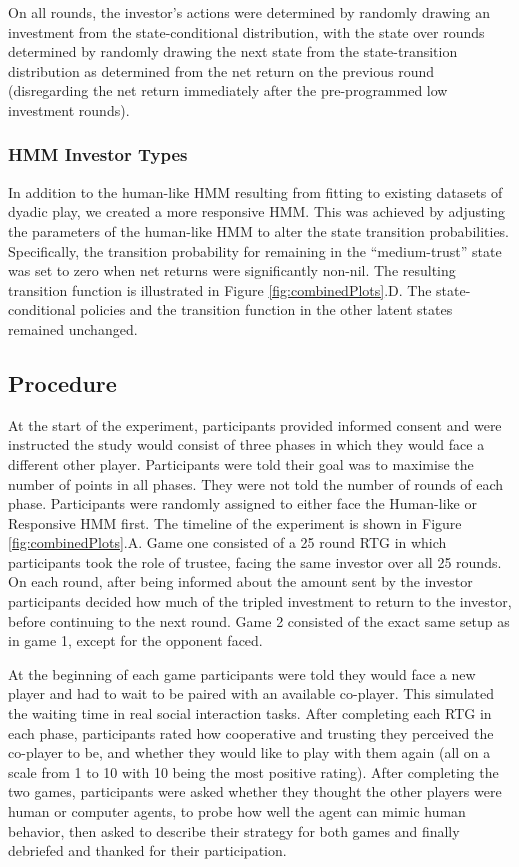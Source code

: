 \documentclass[
]{article}
\begin{document}
On all rounds, the investor's actions were
determined by randomly drawing an investment from the state-conditional
distribution, with the state over rounds determined by randomly drawing
the next state from the state-transition distribution as determined from
the net return on the previous round (disregarding the net return
immediately after the pre-programmed low investment rounds).

\subsubsection{HMM Investor Types}\label{hmm-investor-types}

In addition to the human-like HMM resulting from fitting to existing datasets of dyadic play, we created a more responsive HMM. This was achieved by adjusting the parameters of the human-like HMM to alter the state transition probabilities. Specifically, the transition probability for remaining in the ``medium-trust'' state was set to zero when net returns were significantly non-nil. The resulting transition function is illustrated in Figure \ref{fig:combinedPlots}.D. The state-conditional policies and the transition function in the other latent states remained unchanged.

\subsection{Procedure}\label{procedure}

At the start of the experiment, participants provided informed consent
and were instructed the study would consist of three phases in which
they would face a different other player. Participants were told their
goal was to maximise the number of points in all phases. They were not
told the number of rounds of each phase. Participants were randomly
assigned to either face the Human-like or Responsive HMM first. The timeline of
the experiment is shown in Figure \ref{fig:combinedPlots}.A. Game one
consisted of a 25 round RTG in which participants took the role
of trustee, facing the same investor over all 25 rounds. On each round,
after being informed about the amount sent by the investor participants
decided how much of the tripled investment to return to the investor,
before continuing to the next round. Game 2 consisted of the exact same setup as in game 1, except for the opponent faced.

At the beginning of each game participants were
told they would face a new player and had to wait to be paired with an
available co-player. This simulated the waiting time in real social
interaction tasks. After completing each RTG in each phase, participants
rated how cooperative and trusting they perceived the co-player to be,
and whether they would like to play with them again (all on a scale from
1 to 10 with 10 being the most positive rating). After completing the
two games, participants were asked whether
they thought the other players were human or computer agents, to probe
how well the agent can mimic human behavior, then asked to describe their
strategy for both games and finally debriefed and thanked for their participation.
\end{document}
